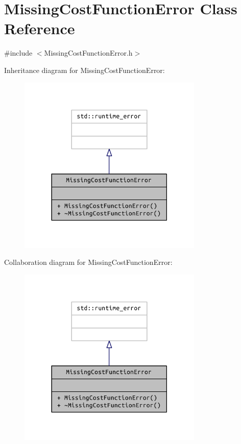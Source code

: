 \hypertarget{class_missing_cost_function_error}{}\section{Missing\+Cost\+Function\+Error Class Reference}
\label{class_missing_cost_function_error}


{\ttfamily \#include $<$Missing\+Cost\+Function\+Error.\+h$>$}



Inheritance diagram for Missing\+Cost\+Function\+Error\+:
\nopagebreak
\begin{figure}[H]
\begin{center}
\leavevmode
\includegraphics[width=249pt]{class_missing_cost_function_error__inherit__graph}
\end{center}
\end{figure}


Collaboration diagram for Missing\+Cost\+Function\+Error\+:
\nopagebreak
\begin{figure}[H]
\begin{center}
\leavevmode
\includegraphics[width=249pt]{class_missing_cost_function_error__coll__graph}
\end{center}
\end{figure}
